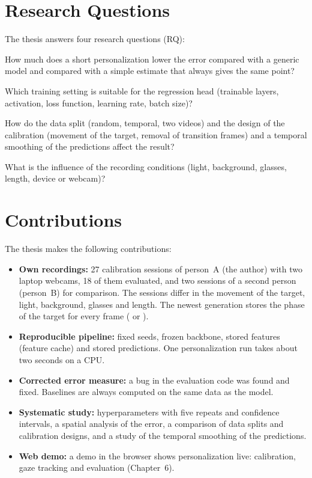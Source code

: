 \section{Research Questions}
\label{sec:forschungsfragen}
The thesis answers four research questions (RQ):
\begin{description}[leftmargin=1.2cm, style=nextline]
  \item[RQ1] How much does a short personalization lower the error compared with
        a generic model and compared with a simple estimate that always gives
        the same point?
  \item[RQ2] Which training setting is suitable for the regression head
        (trainable layers, activation, loss function, learning rate, batch
        size)?
  \item[RQ3] How do the data split (random, temporal, two videos) and the design
        of the calibration (movement of the target, removal of transition
        frames) and a temporal smoothing of the predictions affect the
        result?
  \item[RQ4] What is the influence of the recording conditions (light,
        background, glasses, length, device or webcam)?
\end{description}

\section{Contributions}
\label{sec:beitrag}
The thesis makes the following contributions:
\begin{itemize}
  \item \textbf{Own recordings:} 27 calibration sessions of person~A (the
        author) with two laptop webcams, 18 of them evaluated, and two sessions
        of a second person (person~B) for comparison. The sessions differ in the movement of the target,
        light, background, glasses and length. The newest
        generation stores the phase of the target for every frame (
        or ).
  \item \textbf{Reproducible pipeline:} fixed seeds, frozen backbone, stored
        features (feature cache) and stored predictions. One personalization
        run takes about two seconds on a CPU.
  \item \textbf{Corrected error measure:} a bug in the evaluation code was found
        and fixed. Baselines are always computed on the same data as the
        model.
  \item \textbf{Systematic study:} hyperparameters with five repeats and
        confidence intervals, a spatial analysis of the error, a comparison
        of data splits and calibration designs, and a study of the temporal
        smoothing of the predictions.
  \item \textbf{Web demo:} a demo in the browser shows personalization live:
        calibration, gaze tracking and evaluation (Chapter~6).
\end{itemize}

